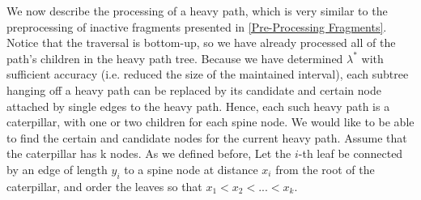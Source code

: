 \documentclass[11pt,a4paper]{article}
\theoremstyle{definition}
\theoremstyle{remark}
\begin{document}
We now describe the processing of a heavy path, which is very similar to the preprocessing of inactive fragments presented in \ref{Pre-Processing Fragments}. Notice that the traversal is bottom-up, so we have already processed all of the path's children in the heavy path tree. Because we have determined $\lambda^*$ with sufficient accuracy (i.e. reduced the size of the maintained interval), each subtree hanging off a heavy path can be replaced by its candidate and certain node attached by single edges to the heavy path. Hence, each such heavy path is a caterpillar, with one or two children for each spine node. We would like to be able to find the certain and candidate nodes for the current heavy path. %
Assume that the caterpillar has k nodes. As we defined before, Let the $i$-th leaf be connected by an edge of length $y_i$ to a spine node at distance $x_i$ from the root of the caterpillar, and order the leaves so that $x_1 < x_2 < ... < x_k$.
\end{document}
